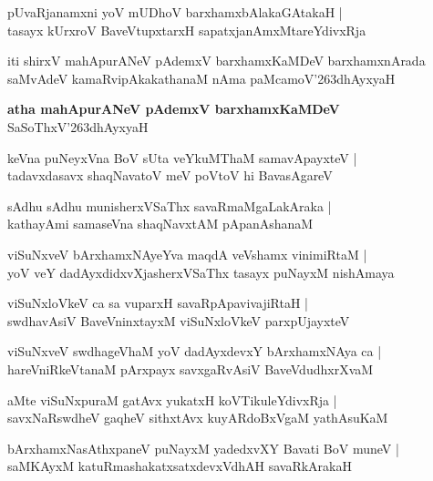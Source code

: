 \begin{shloka}
pUvaRjanamxni yoV mUDhoV barxhamxbAlakaGAtakaH |\\
tasayx kUrxroV BaveVtupxtarxH sapatxjanAmxMtareYdivxRja
\end{shloka}
iti shirxV mahApurANeV pAdemxV barxhamxKaMDeV barxhamxnArada saMvAdeV kamaRvipAkakathanaM nAma paMcamoV\char'263dhAyxyaH

\begin{center}
\textbf{\large atha mahApurANeV pAdemxV barxhamxKaMDeV}\\
SaSoThxV\char'263dhAyxyaH
\end{center}

\setcounter{shloka}{0}
\begin{shloka}
keVna puNeyxVna BoV sUta veYkuMThaM samavApayxteV |\\
tadavxdasavx shaqNavatoV meV poVtoV hi BavasAgareV 
\end{shloka}

\begin{shloka}
sAdhu sAdhu munisherxVSaThx savaRmaMgaLakAraka |\\
kathayAmi samaseVna shaqNavxtAM pApanAshanaM 
\end{shloka}

\begin{shloka}
viSuNxveV bArxhamxNAyeYva maqdA veVshamx vinimiRtaM |\\
yoV veY dadAyxdidxvXjasherxVSaThx tasayx puNayxM nishAmaya
\end{shloka}

\begin{shloka}
viSuNxloVkeV ca sa vuparxH savaRpApavivajiRtaH |\\
swdhavAsiV BaveVninxtayxM viSuNxloVkeV parxpUjayxteV 
\end{shloka}

\begin{shloka}
viSuNxveV swdhageVhaM yoV dadAyxdevxY bArxhamxNAya ca |\\
hareVniRkeVtanaM pArxpayx savxgaRvAsiV BaveVdudhxrXvaM
\end{shloka}

\begin{shloka}
aMte viSuNxpuraM gatAvx yukatxH koVTikuleYdivxRja |\\
savxNaRswdheV gaqheV sithxtAvx kuyARdoBxVgaM yathAsuKaM
\end{shloka}

\begin{shloka}
bArxhamxNasAthxpaneV puNayxM yadedxvXY Bavati BoV muneV |\\
saMKAyxM katuRmashakatxsatxdevxVdhAH savaRkArakaH
\end{shloka}

